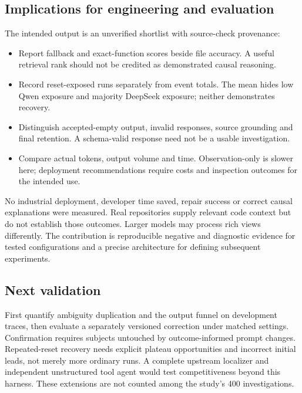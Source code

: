 \subsection{Implications for engineering and evaluation}
The intended output is an unverified shortlist with source-check provenance:
\begin{itemize}
\item Report fallback and exact-function scores beside file accuracy. A useful retrieval rank should not be credited as demonstrated causal reasoning.
\item Record reset-exposed runs separately from event totals. The mean hides low Qwen exposure and majority DeepSeek exposure; neither demonstrates recovery.
\item Distinguish accepted-empty output, invalid responses, source grounding and final retention. A schema-valid response need not be a usable investigation.
\item Compare actual tokens, output volume and time. Observation-only is slower here; deployment recommendations require costs and inspection outcomes for the intended use.
\end{itemize}
No industrial deployment, developer time saved, repair success or correct causal explanations were measured. Real repositories supply relevant code context but do not establish those outcomes. Larger models may process rich views differently. The contribution is reproducible negative and diagnostic evidence for tested configurations and a precise architecture for defining subsequent experiments.

\subsection{Next validation}
First quantify ambiguity duplication and the output funnel on development traces, then evaluate a separately versioned correction under matched settings. Confirmation requires subjects untouched by outcome-informed prompt changes. Repeated-reset recovery needs explicit plateau opportunities and incorrect initial leads, not merely more ordinary runs. A complete upstream localizer and independent unstructured tool agent would test competitiveness beyond this harness. These extensions are not counted among the study's 400 investigations.

